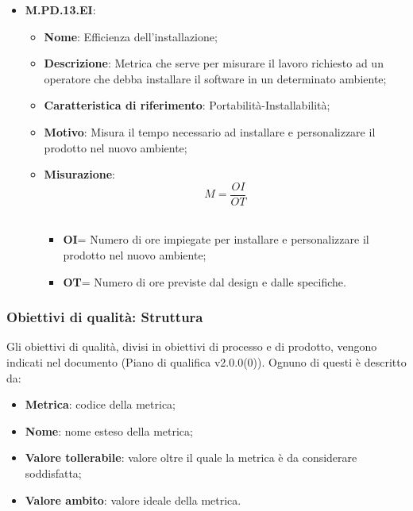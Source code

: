\documentclass[10pt, a4paper]{article}
\begin{document}
\begin{itemize}
        \item \textbf{M.PD.13.EI}:
    \begin{itemize}
        \item \textbf{Nome}: Efficienza dell'installazione;
        \item \textbf{Descrizione}: Metrica che serve per misurare il lavoro richiesto ad un operatore che debba installare il software in un determinato ambiente;
        \item \textbf{Caratteristica di riferimento}: Portabilità-Installabilità;
        \item \textbf{Motivo}: Misura il tempo necessario ad installare e personalizzare il prodotto nel nuovo ambiente; 
      \item \textbf{Misurazione}:   \[ M=\frac{OI}{OT} \] \\
       \begin{itemize}
           \item \textbf{OI}= Numero di ore impiegate per installare e personalizzare il prodotto nel nuovo ambiente;
           \item \textbf{OT}= Numero di ore previste dal design e dalle specifiche.\\
       \end{itemize}
    \end{itemize}
    
 \end{itemize}

    


   
       

   

    
   
    


\subsubsection{Obiettivi di qualità: Struttura}
Gli obiettivi di qualità, divisi in obiettivi di processo e di prodotto, vengono indicati nel documento (Piano di qualifica v2.0.0(0)). Ognuno di questi è descritto da:
\begin{itemize}
    \item \textbf{Metrica}: codice della metrica;
    \item \textbf{Nome}: nome esteso della metrica;
    \item \textbf{Valore tollerabile}: valore oltre il quale la metrica è da considerare soddisfatta;
    \item \textbf{Valore ambito}: valore ideale della metrica.
\end{itemize}
\end{document}
